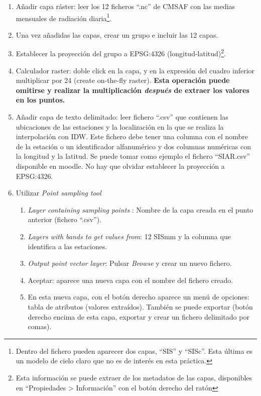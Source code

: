 \documentclass[11pt]{article}
\begin{document}
\begin{enumerate}
\item Añadir capa ráster: leer los 12 ficheros ``.nc'' de CMSAF con
  las medias mensuales de radiación diaria\footnote{Dentro del fichero
    pueden aparecer dos capas, ``SIS'' y ``SISc''. Esta última es un
    modelo de cielo claro que no es de interés en esta práctica.}.
\item Una vez añadidas las capas, crear un grupo e incluir las 12 capas.
\item Establecer la proyección del grupo a EPSG:4326 (longitud-latitud)\footnote{Esta información se puede extraer de los metadatos de las capas, disponibles en ``Propiedades > Información'' con el botón derecho del ratón}.
\item Calculador raster: doble click en la capa, y en la expresión del
  cuadro inferior multiplicar por 24 (create on-the-fly raster). \textbf{Esta
  operación puede omitirse y realizar la multiplicación \emph{después}
  de extraer los valores en los puntos.}
\item Añadir capa de texto delimitado: leer fichero ``.csv'' que
  contienen las ubicaciones de las estaciones y la localización en la
  que se realiza la interpolación con IDW. Este fichero debe tener una
  columna con el nombre de la estación o un identificador alfanumérico
  y dos columnas numéricas con la longitud y la latitud. Se puede
  tomar como ejemplo el fichero ``SIAR.csv'' disponible en moodle. No
  hay que olvidar establecer la proyección a EPSG:4326.
\item Utilizar \emph{Point sampling tool}
  \begin{enumerate}
  \item \emph{Layer containing sampling points} : Nombre de la capa
    creada en el punto anterior (fichero ``.csv'').
  \item \emph{Layers with bands to get values from}: 12 SISmm y la
    columna que identifica a las estaciones.
  \item \emph{Output point vector layer}: Pulsar \emph{Browse} y crear
    un nuevo fichero.
  \item Aceptar: aparece una nueva capa con el nombre del fichero
    creado.
  \item En esta nueva capa, con el botón derecho aparece un menú de
    opciones: tabla de atributos (valores extraídos). También se puede
    exportar (botón derecho encima de esta capa, exportar y crear un
    fichero delimitado por comas).
  \end{enumerate}
\end{enumerate}
\end{document}
